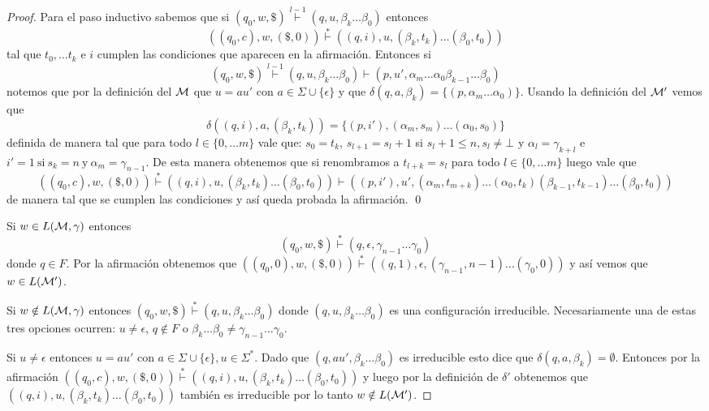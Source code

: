 \documentclass[tesis.tex]{subfiles}
\begin{document}
\begin{proof}
	Para el paso inductivo sabemos que si $(q_{0}, w, \$) \overset{l-1}{\vdash} (q, u, \beta_k \dots  \beta_0)$ entonces
	\[
		((q_0,c), w, (\$,0)) \overset{*}{\vdash} ((q,i), u, (\beta_k, t_k)\dots (\beta_0,t_0))	
	\]
	tal que $t_{0}, \dots t_{k}$ e $i$ cumplen las condiciones que aparecen en la afirmación.
	Entonces si
	\[
		(q_{0}, w, \$) \overset{l-1}{\vdash} (q, u, \beta_k \dots  \beta_0) \vdash (p,u',\alpha_{m} \dots \alpha_{0}\beta_{k-1} \dots \beta_{0})	
	\]
	notemos que por la definición del \APD ${\cal M}$ que $u = a u'$ con $a \in \Sigma \cup \{\epsilon\}$ y que $\delta(q,a,\beta_{k}) = \{ (p, \alpha_{m} \dots \alpha_{0}) \}$.
	Usando la definición del \APD $\cal M'$ vemos que
	\[
		\delta((q,i),a,(\beta_{k},t_{k})) = \{ (p,i'), (\alpha_{m},s_{m})\dots (\alpha_{0},s_{0}) \}	
	\]
	definida de manera tal que para todo $l \in \{ 0, \dots m \}$ vale que: $s_{0} = t_{k}$,
	$s_{l+1} = s_{l} + 1$ si $s_{l}+1 \le n, s_{l} \neq \bot$ y $\alpha_{l} = \gamma_{k+l}$ e
	$i' = 1 \ \text{si} \ s_k=n \ \text{y} \ \alpha_m=\gamma_{n-1}$. 
	De esta manera obtenemos que si renombramos a $t_{l+k} = s_{l}$ para todo $l \in \{ 0, \dots m \}$ luego vale que
	\[
		((q_0,c), w, (\$,0))  \overset{*}{\vdash} ((q,i), u, (\beta_k, t_k)\dots (\beta_0,t_0))	\vdash 	((p,i'),u',(\alpha_{m}, t_{m+k}) \dots (\alpha_{0}, t_{k}) (\beta_{k-1}, t_{k-1}) \dots (\beta_{0}, t_{0}))
	\]
	de manera tal que se cumplen las condiciones y así queda probada la afirmación. \qed
	\smallskip

	Si $w \in L({\cal M}, \gamma)$ entonces
	\[
		(q_{0}, w, \$) \overset{*}{\vdash} (q, \epsilon, \gamma_{n-1} \dots \gamma_0) 
	\] 
	donde $q \in F$.
	Por la afirmación obtenemos que $((q_0,0), w, (\$,0)) \overset{*}{\vdash} ((q,1), \epsilon, (\gamma_{n-1}, n-1)\dots (\gamma_0,0))$ y así vemos que $w \in L({\cal M}')$.

	Si $w \notin L({\cal M}, \gamma)$ entonces $(q_{0}, w, \$) \overset{*}{\vdash} (q, u, \beta_k \dots \beta_0)$ donde $(q, u, \beta_k \dots \beta_0)$ es una configuración irreducible.
	Necesariamente una de estas tres opciones ocurren: 
	$u \neq \epsilon$, $q \notin F$ o $\beta_{k} \dots \beta_{0} \neq \gamma_{n-1} \dots \gamma_{0}$.

	Si $u \neq \epsilon$ entonces $u = au'$ con 
	$a \in \Sigma \cup \{ \epsilon \}, u \in \Sigma^{*}$. 
	Dado que $(q, au', \beta_k \dots \beta_0)$ es irreducible esto dice que $\delta(q,a,\beta_{k}) = \emptyset$.
	Entonces por la afirmación 
	$((q_0,c), w, (\$,0)) \overset{*}{\vdash} ((q,i), u, (\beta_k, t_k)\dots (\beta_0,t_0))$ y luego por la definición de $\delta'$ obtenemos que $((q,i), u, (\beta_k, t_k)\dots (\beta_0,t_0))$ también es irreducible por lo tanto $w \notin L({\cal M}')$.


\end{proof}
\end{document}

